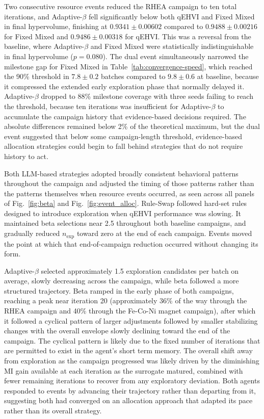 Two consecutive resource events reduced the RHEA campaign to ten total iterations, and Adaptive-$\beta$ fell significantly below both qEHVI and Fixed Mixed in final hypervolume, finishing at $0.9341 \pm 0.00602$ compared to $0.9488 \pm 0.00216$ for Fixed Mixed and $0.9486 \pm 0.00318$ for qEHVI. This was a reversal from the baseline, where Adaptive-$\beta$ and Fixed Mixed were statistically indistinguishable in final hypervolume ($p = 0.080$). The dual event simultaneously narrowed the milestone gap for Fixed Mixed in Table~\ref{tab:convergence-speed}, which reached the 90\% threshold in $7.8 \pm 0.2$ batches compared to $9.8 \pm 0.6$ at baseline, because it compressed the extended early exploration phase that normally delayed it. Adaptive-$\beta$ dropped to 88\% milestone coverage with three seeds failing to reach the threshold, because ten iterations was insufficient for Adaptive-$\beta$ to accumulate the campaign history that evidence-based decisions required. The absolute differences remained below 2\% of the theoretical maximum, but the dual event suggested that below some campaign-length threshold, evidence-based allocation strategies could begin to fall behind strategies that do not require history to act.

Both LLM-based strategies adopted broadly consistent behavioral patterns throughout the campaign and adjusted the timing of those patterns rather than the patterns themselves when resource events occurred, as seen across all panels of Fig.~\ref{fig:beta} and Fig.~\ref{fig:event_alloc}. Rule-Swap followed hard-set rules designed to introduce exploration when qEHVI performance was slowing. It maintained beta selections near 2.5 throughout both baseline campaigns, and gradually reduced $n_\mathrm{exp}$ toward zero at the end of each campaign. Events moved the point at which that end-of-campaign reduction occurred without changing its form. 

Adaptive-$\beta$ selected approximately 1.5 exploration candidates per batch on average, slowly decreasing across the campaign, while beta followed a more structured trajectory. Beta ramped in the early phase of both campaigns, reaching a peak near iteration 20 (approximately 36\% of the way through the RHEA campaign and 40\% through the Fe-Co-Ni magnet campaign), after which it followed a cyclical pattern of larger adjustments followed by smaller stabilizing changes with the overall envelope slowly declining toward the end of the campaign. The cyclical pattern is likely due to the fixed number of iterations that are permitted to exist in the agent's short term memory. The overall shift away from exploration as the campaign progressed was likely driven by the diminishing MI gain available at each iteration as the surrogate matured, combined with fewer remaining iterations to recover from any exploratory deviation. Both agents responded to events by advancing their trajectory rather than departing from it, suggesting both had converged on an allocation approach that adapted its pace rather than its overall strategy.

